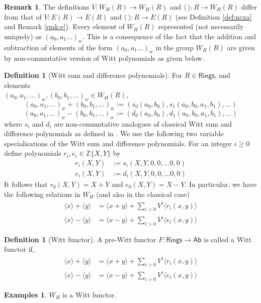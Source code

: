 \documentclass[11pt]{amsart}
\theoremstyle{plain}
\theoremstyle{definition}
\newtheorem{remark}[thm]{Remark}
\newtheorem{definition}[thm]{Definition}
\newtheorem{examples}[thm]{Examples}
\newcommand{\Z}{{\mathbb Z}}
\newcommand{\ab}[1]{\langle {#1} \rangle}
\newcommand{\ac}[1]{\{#1\}}
\newcommand{\Rings}{{\mathsf{Rings}}}
\newcommand{\Ab}{{\mathsf{Ab}}}
\begin{document}
\begin{remark}
 The definitions $V: W_H(R) \to W_H(R)$ and $\langle \ \rangle : R \longrightarrow W_H(R)$ differ from that of $V: E(R) \to E(R)$ and $\langle \ \rangle : R \longrightarrow E(R)$ (see Definition \ref{def:ncxa} and Remark \ref{rmk:e}). Every element of $W_H(R)$ represented (not necessarily uniquely) as $(a_0,a_1...)_w$. This is a consequence of the fact that the addition and subtraction of elements of the form $(a_0,a_1...)_w$ in the group $W_H(R)$ are given by non-commutative version of Witt polynomials as given below. 
\end{remark}
\begin{definition}[Witt sum and difference polynomials]\label{rnen}
For $R \in \Rings$, and elements \\
$(a_0,a_1,...)_w, (b_0, b_1, ...)_w \in W_H(R)$,
$$ (a_0,a_1,...)_w +  (b_0, b_1, ...)_w  := (s_0(a_0,b_0), s_1(a_0,b_0,a_1,b_1),...)$$
$$ (a_0,a_1,...)_w -  (b_0, b_1, ...)_w  := (d_0(a_0,b_0), d_1(a_0,b_0,a_1,b_1),...)$$
where $s_i$ and $d_i$ are non-commutative analogues of classical Witt sum and difference polynomials as defined in \cite[1.4.1]{h1}. We use the following two variable specialisations of the Witt sum and difference polynomials. For an integer $i\geq 0$
define polynomials $r_i, e_i\in \Z\ac{X,Y}$ by 
\begin{align*}
 r_i(X,Y) & := s_i(X,Y,0,0,...0,0)\\
 e_i(X,Y) & := d_i(X,Y,0,0,...0,0)
 \end{align*}
It follows that $r_0(X,Y) = X+Y$ and $e_0(X,Y)=X-Y$. In particular, we have the following relations in $W_H$ (and also in the classical case)
\begin{align*}
 \ab{x} + \ab{y} & = \ab{x+y} + \sum_{i>0} V^i \ab{r_i(x,y)} \\
 \ab{x} - \ab{y} & = \ab{x-y} + \sum_{i>0} V^i \ab{e_i(x,y)}
\end{align*}
\end{definition}
\begin{definition}[Witt functor]\label{witt}
A pre-Witt functor $F : \Rings \to \Ab$ is called a Witt functor if,
\begin{align*}
 \ab{x} + \ab{y} & = \ab{x+y} + \sum_{i>0} V^i \ab{r_i(x,y)} \\
 \ab{x} - \ab{y} & = \ab{x-y} + \sum_{i>0} V^i \ab{e_i(x,y)}
\end{align*}
\end{definition}

\begin{examples} $W_H$ is a Witt functor.
\end{examples} 
\end{document}
